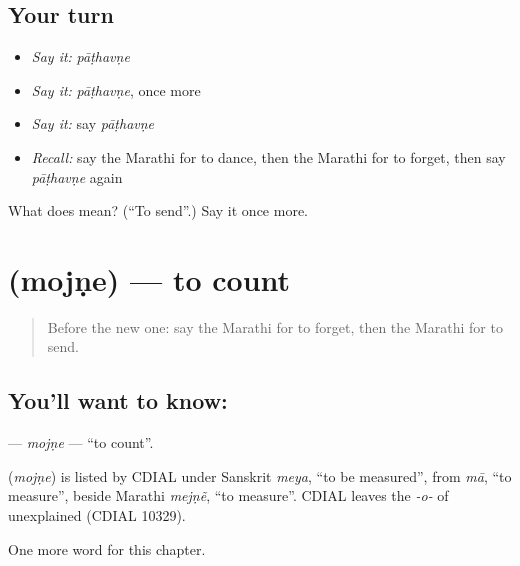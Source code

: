 \subsection*{Your turn}
\begin{itemize}
\raggedright
  \item \emph{Say it:} \emph{pāṭhavṇe}
  \item \emph{Say it:} \emph{pāṭhavṇe}, once more
  \item \emph{Say it:} say \emph{pāṭhavṇe}
  \item \emph{Recall:} say the Marathi for to dance, then the Marathi for to forget, then say \emph{pāṭhavṇe} again
\end{itemize}

\begin{tcolorbox}[breakable,colback=teal!4,colframe=teal!35!black,title={Before you move on}]
What does  mean? (\textquotedblleft{}To send\textquotedblright{}.) Say it once more.
\end{tcolorbox}
\section[\texorpdfstring{\mr{मोजणे} (mojṇe)}{मोजणे (mojṇe)}]{ (mojṇe) — to count}

\label{lesson:MR-C80-mojne}



\begin{quote}
Before the new one: say the Marathi for to forget, then the Marathi for to send.
\end{quote}

\subsection*{You'll want to know: }
\textbf{} — \emph{mojṇe} — \textquotedblleft{}to count\textquotedblright{}.

\begin{cousinweb}
\textbf{} (\emph{mojṇe}) is listed by CDIAL under Sanskrit \emph{meya}, \textquotedblleft{}to be measured\textquotedblright{}, from \emph{mā}, \textquotedblleft{}to measure\textquotedblright{}, beside Marathi \emph{mejṇẽ}, \textquotedblleft{}to measure\textquotedblright{}. CDIAL leaves the \emph{-o-} of \textbf{} unexplained (CDIAL 10329).
\end{cousinweb}

\begin{grammarlens}[title={What you've built}]
One more word for this chapter.
\end{grammarlens}

